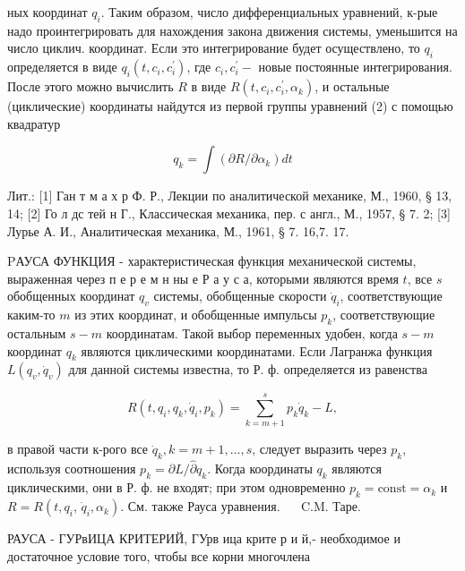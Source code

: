 \documentclass[10pt]{article}
\begin{document}
ных координат $q_{i}$. Таким образом, число дифференциальных уравнений, к-рые надо проинтегрировать для нахождения закона движения системы, уменьшится на число циклич. координат. Если это интегрирование будет осуществлено, то $q_{i}$ определяется в виде $q_{i}\left(t, c_{i}, c_{i}^{\prime}\right)$, где $c_{i}, c_{i}^{\prime}-$ новые постоянные интегрирования. После этого можно вычислить $R$ в виде $R\left(t, c_{i}, c_{i}^{\prime}, \alpha_{k}\right)$, и остальные (циклические) координаты найдутся из первой группы уравнений (2) с помощью квадратур



\[

q_{k}=\int\left(\partial R / \partial \alpha_{k}\right) d t

\]



Лит.: [1] Ган т м а х р Ф. Р., Лекции по аналитической механике, М., 1960, § 13, 14; [2] Го л дс тей н Г., Классическая механика, пер. с англ., М., 1957, § 7. 2; [3] Лурье А. И., Аналитическая механика, М., 1961, § 7. 16,7. 17.



PАУСА ФУНКЦИЯ - характеристическая функция механической системы, выраженная через п е р е м н ны е Р а у с а, которыми являются время $t$, все $s$ обобщенных координат $q_{v}$ системы, обобщенные скорости $\dot{q}_{i}$, соответствующие каким-то $m$ из этих координат, и обобщенные импульсы $p_{k}$, соответствующие остальным $s-m$ координатам. Такой выбор переменных удобен, когда $s-m$ координат $q_{k}$ являются циклическими координатами. Если Лагранжа функция $L\left(q_{v}, \dot{q}_{v}\right)$ для данной системы известна, то Р. ф. определяется из равенства



\[

R\left(t, q_{i}, q_{k}, \dot{q}_{i}, p_{k}\right)=\sum_{k=m+1}^{s} p_{k} \dot{q}_{k}-L,

\]



в правой части к-рого все $\dot{q}_{k}, k=m+1, \ldots, s$, следует выразить через $p_{k}$, используя соотношения $p_{k}=\partial L / \hat{\partial} q_{k}$. Когда координаты $q_{k}$ являются циклическими, они в Р. ф. не входят; при этом одновременно $p_{k}=\mathrm{const}=\alpha_{k}$ и $R=R\left(t, q_{i}\right.$, $\left.\dot{q}_{i}, \alpha_{k}\right)$. См. также Рауса уравнения. $\quad$ C.M. Таре.



РАУСА - ГУРвИЦА КРИТЕРИЙ, ГУрв ица крите р и й,- необходимое и достаточное условие того, чтобы все корни многочлена
\end{document}
